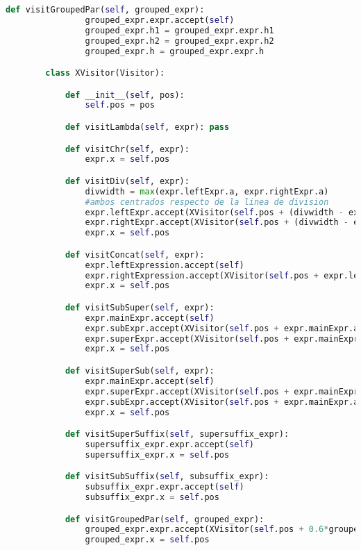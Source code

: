 \begin{lstlisting}[language=Python]
            def visitGroupedPar(self, grouped_expr):
                grouped_expr.expr.accept(self)
                grouped_expr.h1 = grouped_expr.expr.h1
                grouped_expr.h2 = grouped_expr.expr.h2
                grouped_expr.h = grouped_expr.expr.h

        class XVisitor(Visitor):

            def __init__(self, pos):
                self.pos = pos

            def visitLambda(self, expr): pass

            def visitChr(self, expr):
                expr.x = self.pos

            def visitDiv(self, expr):
                divwidth = max(expr.leftExpr.a, expr.rightExpr.a)
                #ambos centrados respecto de la linea de division
                expr.leftExpr.accept(XVisitor(self.pos + (divwidth - expr.leftExpr.a)/2))
                expr.rightExpr.accept(XVisitor(self.pos + (divwidth - expr.rightExpr.a)/2))
                expr.x = self.pos

            def visitConcat(self, expr):
                expr.leftExpression.accept(self)
                expr.rightExpression.accept(XVisitor(self.pos + expr.leftExpression.a))
                expr.x = self.pos

            def visitSubSuper(self, expr):
                expr.mainExpr.accept(self)
                expr.subExpr.accept(XVisitor(self.pos + expr.mainExpr.a))
                expr.superExpr.accept(XVisitor(self.pos + expr.mainExpr.a))
                expr.x = self.pos

            def visitSuperSub(self, expr):
                expr.mainExpr.accept(self)
                expr.superExpr.accept(XVisitor(self.pos + expr.mainExpr.a))
                expr.subExpr.accept(XVisitor(self.pos + expr.mainExpr.a))
                expr.x = self.pos

            def visitSuperSuffix(self, supersuffix_expr):
                supersuffix_expr.expr.accept(self)
                supersuffix_expr.x = self.pos

            def visitSubSuffix(self, subsuffix_expr):
                subsuffix_expr.expr.accept(self)
                subsuffix_expr.x = self.pos

            def visitGroupedPar(self, grouped_expr):
                grouped_expr.expr.accept(XVisitor(self.pos + 0.6*grouped_expr.e)) # dejar espacio para '('
                grouped_expr.x = self.pos


\end{lstlisting}
